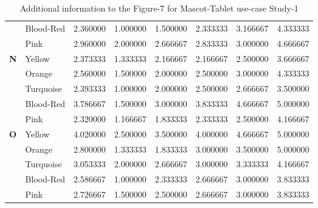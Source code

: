 \begin{table}[H]
\begin{center}
\begin{tabular}{ |p{0.5cm}| p{2cm}|p{1.5cm}|p{1.5cm}| p{1.5cm}|p{1.5cm}|p{1.5cm}| p{1.5cm}| }
& Blood-Red & 2.360000 & 1.000000 &1.500000 &2.333333 &3.166667& 4.333333\\
&      Pink & 2.960000 & 2.000000 &2.666667 &2.833333 &3.000000 &4.666667\\
 \hline 
 \hline 
 \multirow{5}{*}{\textbf{N}} 
&    Yellow & 2.373333 & 1.333333 &2.166667 &2.166667 &2.500000 &3.666667\\
&    Orange & 2.560000 & 1.500000 &2.000000 &2.500000 &3.000000 &4.333333\\
& Turquoise & 2.393333 & 1.000000 &2.000000 &2.500000 &2.666667 &3.500000\\
& Blood-Red & 3.786667 & 1.500000 &3.000000 &3.833333 &4.666667 &5.000000\\
&      Pink & 2.320000 & 1.166667 &1.833333 &2.333333 &2.500000 &4.166667\\
 \hline 
 \hline 
 \multirow{5}{*}{\textbf{O}} 
&    Yellow & 4.020000 & 2.500000 &3.500000 &4.000000 &4.666667 &5.000000\\
&    Orange & 2.800000 & 1.333333 &1.833333 &3.000000 &3.500000 &5.000000\\
& Turquoise & 3.053333 & 2.000000 &2.666667 &3.000000& 3.333333 &4.166667\\
& Blood-Red & 2.586667 & 1.000000 &2.333333 &2.666667 &3.000000 &3.833333\\
&      Pink & 2.726667 & 1.500000 &2.500000& 2.666667 &3.000000 &3.833333\\
 \hline 
\end{tabular}
\end{center}
\caption{Additional information to the Figure-7 for Mascot-Tablet use-case Study-1}
\end{table}


